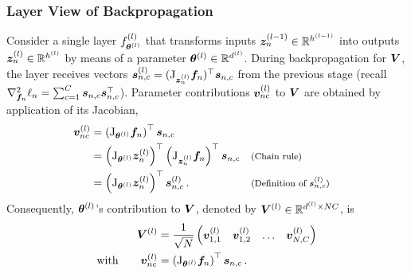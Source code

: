 \subsubsection{Layer View of Backpropagation}

Consider a single layer $f^{(l)}_{{\bm{\theta}}^{(l)}}$ that transforms inputs
${\bm{z}}_n^{(l-1)} \in {\mathbb{R}}^{h^{(l-1)}}$ into outputs ${\bm{z}}_n^{(l)} \in {\mathbb{R}}^{h^{(l)}}$
by means of a parameter ${\bm{\theta}}^{(l)} \in {\mathbb{R}}^{d^{(l)}}$. During
backpropagation for ${\bm{V}}$, the layer receives vectors $ {\bm{s}}_{n,c}^{(l)} =
(\mathrm{J}_{{\bm{z}}_n^{(l)}}{\bm{f}}_n)^\top {\bm{s}}_{n,c}$
from the previous stage (recall $\nabla_{{\bm{f}}_n}^2\ell_n = \sum_{c=1}^C {\bm{s}}_{n,c}
{\bm{s}}_{n,c}^\top$). Parameter contributions ${\bm{v}}_{nc}^{(l)}$ to ${\bm{V}}$ are obtained
by application of its Jacobian,
\begin{align}
  \nonumber
  {\bm{v}}_{nc}^{(l)}
  &=
    \left(
    \mathrm{J}_{{\bm{\theta}}^{(l)}} {\bm{f}}_n
    \right)^\top
    {\bm{s}}_{n,c}
  \\
  \nonumber
  &=
    \left(
    \mathrm{J}_{{\bm{\theta}}^{(l)}} {\bm{z}}_n^{(l)}
    \right)^\top
    \left(
    \mathrm{J}_{{\bm{z}}_n^{(l)}} {\bm{f}}_n
    \right)^\top
    {\bm{s}}_{n,c}
    &&{\footnotesize\text{(Chain rule)}}
  \\
  &=
    \left(
    \mathrm{J}_{{\bm{\theta}}^{(l)}} {\bm{z}}_n^{(l)}
    \right)^\top
    {\bm{s}}_{n,c}^{(l)}\,.
    &&{\footnotesize\text{(Definition of ${\bm{s}}_{n,c}^{(l)}$)}}
    \label{vivit::eq:ggn-vector-layer-i}
\end{align}
Consequently, ${\bm{\theta}}^{(l)}$'s contribution to ${\bm{V}}$, denoted by
${\bm{V}}^{(l)} \in {\mathbb{R}}^{d^{(l)} \times NC}$, is
\begin{align}
  \label{vivit::eq:layerwise-ggn-factor}
  \begin{split}
    {\bm{V}}^{(l)}
    &=
      \frac{1}{\sqrt{N}}
      \begin{pmatrix}
        {\bm{v}}^{(l)}_{1,1} & {\bm{v}}^{(l)}_{1,2} & \dots & {\bm{v}}^{(l)}_{N,C}
      \end{pmatrix}
    \\
    \text{with}\qquad
    {\bm{v}}_{nc}^{(l)}
    &=
      \left(
      \mathrm{J}_{{\bm{\theta}}^{(l)}} {\bm{f}}_n\right)^\top
      {\bm{s}}_{n,c}\,.
  \end{split}
\end{align}

